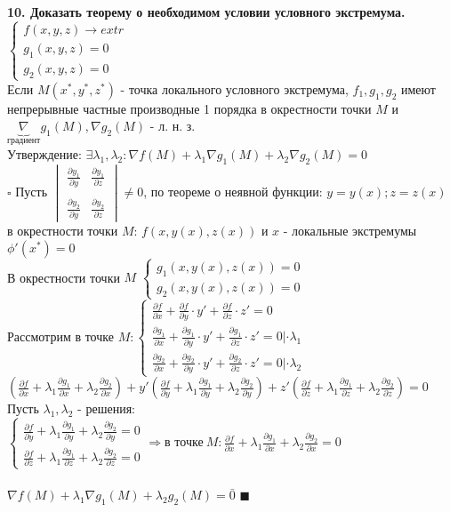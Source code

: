 \documentclass[11pt,a4paper]{article}
\newcommand{\proof}{$\square$ }
\newcommand{\qed}{\hfill$\blacksquare$}
\newcommand{\p}{\partial}
\begin{document}
\textbf{10. Доказать теорему о необходимом условии условного экстремума.\\}
$\begin{cases}
    f(x, y, z) \rightarrow extr
    \\
    g_1(x, y, z) = 0
    \\
    g_2(x, y, z) = 0
\end{cases}$
\\
Если $M(x^*, y^*, z^*)$ - точка локального условного экстремума, $f_1, g_1, g_2$ имеют непрерывные частные производные 1 порядка в окрестности точки $M$ и $\underbrace{\nabla}_{\text{градиент}} g_1(M), \nabla g_2(M)$ - л. н. з.
\\
Утверждение: $\exists \lambda_1, \lambda_2: \nabla f(M) + \lambda_1 \nabla g_1(M) + \lambda_2 \nabla g_2(M) = 0$
\\
\proof Пусть 
$\begin{vmatrix}
    \frac{\p y_1}{\p y}&\frac{\p y_1}{\p z}
    \\
    \\
    \frac{\p y_2}{\p y}&\frac{\p y_2}{\p z}
\end{vmatrix}
\neq 0$, по теореме о неявной функции: $y = y(x); z = z(x)$ в окрестности точки $M$:
$f(x, y(x), z(x))$ и $x$ - локальные экстремумы $\phi'(x^*) = 0$
\\
В окрестности точки $M$
$\begin{cases}
    g_1(x, y(x), z(x)) = 0
    \\
    g_2(x, y(x), z(x)) = 0
\end{cases}$
\\
Рассмотрим в точке
$M:
\begin{cases}
    \frac{\p f}{\p x} + \frac{\p f}{\p y} \cdot y' + \frac{\p f}{\p z} \cdot z' = 0
    \\
    \frac{\p g_1}{\p x} + \frac{\p g_1}{\p y} \cdot y' + \frac{\p g_1}{\p z} \cdot z' = 0| \cdot \lambda_1
    \\
    \frac{\p g_2}{\p x} + \frac{\p g_2}{\p y} \cdot y' + \frac{\p g_2}{\p z} \cdot z' = 0| \cdot \lambda_2
\end{cases}$
\\
$\left(\frac{\p f}{\p x} + \lambda_1\frac{\p g_1}{\p x} + \lambda_2\frac{\p g_2}{\p x}\right) + y'\left(\frac{\p f}{\p y} + \lambda_1\frac{\p g_1}{\p y} + \lambda_2\frac{\p g_2}{\p y}\right) + z'\left(\frac{\p f}{\p z} + \lambda_1\frac{\p g_1}{\p z} + \lambda_2\frac{\p g_2}{\p z}\right) = 0$
\\
Пусть $\lambda_1, \lambda_2$ - решения:
$\begin{cases}
    \frac{\p f}{\p y} + \lambda_1\frac{\p g_1}{\p y} + \lambda_2\frac{\p g_2}{\p y} = 0
    \\
    \frac{\p f}{\p z} + \lambda_1\frac{\p g_1}{\p z} + \lambda_2\frac{\p g_2}{\p z} = 0
\end{cases}
\Rightarrow
\text{в точке} \ M: \frac{\p f}{\p x} + \lambda_1\frac{\p g_1}{\p x} + \lambda_2\frac{\p g_2}{\p x} = 0$
\\
\\
$\nabla f(M) + \lambda_1 \nabla g_1(M) + \lambda_2 g_2(M) = \bar{0}$
\qed
\end{document}
